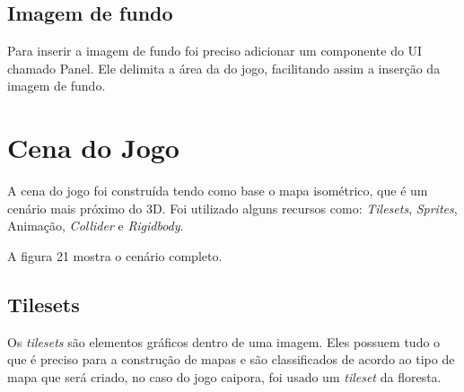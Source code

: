\subsection{Imagem de fundo}
Para inserir a imagem de fundo foi preciso adicionar um componente do UI chamado Panel. Ele delimita a área da do jogo, facilitando assim a inserção da imagem de fundo.

\section{Cena do Jogo}
A cena do jogo foi construída tendo como base o mapa isométrico, que é um cenário mais próximo do 3D. Foi utilizado alguns recursos como: \textit{Tilesets}, \textit{Sprites}, Animação, \textit{Collider} e \textit{Rigidbody}.

A figura 21 mostra o cenário completo.

\begin{figure}[h!]
		\centering
	\end{figure}

\subsection{Tilesets}
Os \textit{tilesets} são elementos gráficos dentro de uma imagem. Eles possuem tudo o que é preciso para a construção de mapas e são classificados de acordo ao tipo de mapa que será criado, no caso do jogo caipora, foi usado um \textit{tileset} da floresta.

